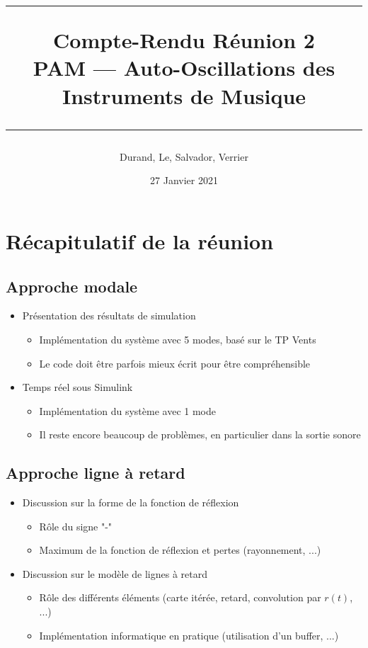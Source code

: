 \documentclass[a4paper, 11pt]{article}
\title{
	\noindent\rule{\linewidth}{0.4pt}
	\huge{Compte-Rendu Réunion 2\\}
	\medskip
	\Large{PAM --- Auto-Oscillations des Instruments de Musique}
	\noindent\rule{\linewidth}{1pt}
}
\author{Durand, Le, Salvador, Verrier}
\date{27 Janvier 2021}
\begin{document}
\maketitle


\section{Récapitulatif de la réunion}
	\subsection{Approche modale}
	\begin{itemize}
		\item Présentation des résultats de simulation
		\begin{itemize}
			\item Implémentation du système avec 5 modes, basé sur le TP Vents 
			\item Le code doit être parfois mieux écrit pour être compréhensible
		\end{itemize}
		\item Temps réel sous Simulink
		\begin{itemize}
			\item Implémentation du système avec 1 mode
			\item Il reste encore beaucoup de problèmes, en particulier dans la sortie sonore
		\end{itemize}
	\end{itemize}
		
	\subsection{Approche ligne à retard}
	\begin{itemize}
		\item Discussion sur la forme de la fonction de réflexion 
		\begin{itemize}
			\item Rôle du signe "-"
			\item Maximum de la fonction de réflexion et pertes (rayonnement, ...)
		\end{itemize}
		\item Discussion sur le modèle de lignes à retard 
		\begin{itemize}
			\item Rôle des différents éléments (carte itérée, retard, convolution par $r(t)$, ...)
			\item Implémentation informatique en pratique (utilisation d'un buffer, ...)
		\end{itemize}
	\end{itemize}
\end{document}
